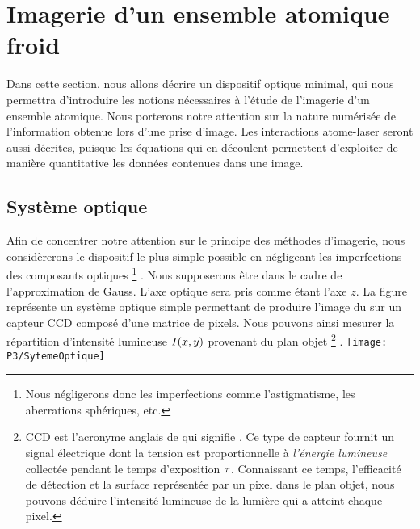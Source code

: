 \casse

\section{Imagerie d'un ensemble atomique froid}\label{sec:FaireLimage}
Dans cette section, nous allons décrire un dispositif optique minimal, qui nous permettra d'introduire les notions nécessaires à l'étude de l'imagerie d'un ensemble atomique. Nous porterons notre attention sur la nature numérisée de l'information obtenue lors d'une prise d'image. Les interactions atome-laser seront aussi décrites, puisque les équations qui en découlent permettent d'exploiter de manière quantitative les données contenues dans une image.


\subsection{Système optique}\label{sec:SystOptique}
Afin de concentrer notre attention sur le principe des méthodes d'imagerie, nous considèrerons le dispositif le plus simple possible en négligeant les imperfections des composants optiques%
\footnote{Nous négligerons donc les imperfections comme l'astigmatisme, les aberrations sphériques, etc.}%
. Nous supposerons être dans le cadre de l'approximation de Gauss. 
L'axe optique sera pris comme étant l'axe $z$. 
La figure~ représente un système optique simple permettant de produire l'image du \nat sur un capteur CCD composé d'une matrice de pixels. Nous pouvons ainsi mesurer la répartition d'intensité lumineuse ${{I}(x,y)}$ provenant du plan objet%
%
\footnote{CCD est l'acronyme anglais de  qui signifie . Ce type de capteur fournit un signal électrique dont la tension est proportionnelle à \emph{l'énergie lumineuse} collectée pendant le temps d'exposition ${\tau}$. Connaissant ce temps, l'efficacité de détection et la surface représentée par un pixel dans le plan objet, nous pouvons déduire l'intensité lumineuse de la lumière qui a atteint chaque pixel.}%
.
\bfighs
\texttt{[image: P3/SytemeOptique]}
\label{fig:SytemeOptique}
\efigh

